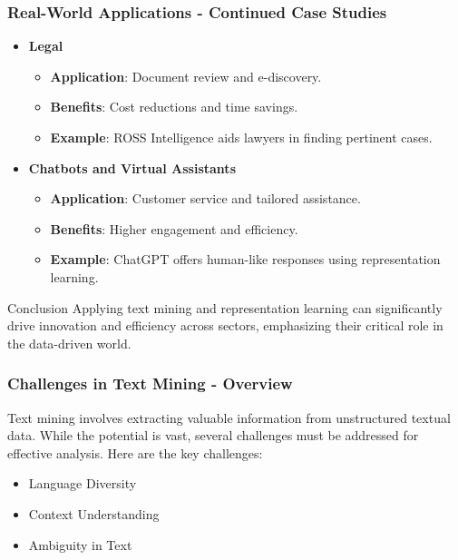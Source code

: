 \documentclass[aspectratio=169]{beamer}
\begin{document}
\begin{frame}[fragile]
    \frametitle{Real-World Applications - Continued Case Studies}
    \begin{itemize}
        \item \textbf{Legal}
            \begin{itemize}
                \item \textbf{Application}: Document review and e-discovery.
                \item \textbf{Benefits}: Cost reductions and time savings.
                \item \textbf{Example}: ROSS Intelligence aids lawyers in finding pertinent cases.
            \end{itemize}
        
        \item \textbf{Chatbots and Virtual Assistants}
            \begin{itemize}
                \item \textbf{Application}: Customer service and tailored assistance.
                \item \textbf{Benefits}: Higher engagement and efficiency.
                \item \textbf{Example}: ChatGPT offers human-like responses using representation learning.
            \end{itemize}
    \end{itemize}

    \begin{block}{Conclusion}
        Applying text mining and representation learning can significantly drive innovation and efficiency across sectors, emphasizing their critical role in the data-driven world.
    \end{block}
\end{frame}

\begin{frame}[fragile]
    \frametitle{Challenges in Text Mining - Overview}
    Text mining involves extracting valuable information from unstructured textual data. 
    While the potential is vast, several challenges must be addressed for effective analysis. 
    Here are the key challenges:
    \begin{itemize}
        \item Language Diversity
        \item Context Understanding
        \item Ambiguity in Text
    \end{itemize}
\end{frame}
\end{document}
